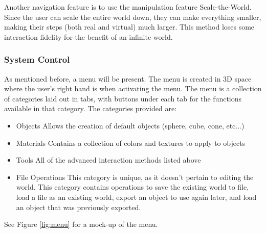 Another navigation feature is to use the manipulation feature Scale-the-World.
Since the user can scale the entire world down, they can make everything smaller, making their steps (both real and virtual) much larger.
This method loses some interaction fidelity for the benefit of an infinite world.

\subsubsection{System Control}
\label{Design:Interaction:SystemControl}
As mentioned before, a menu will be present.
The menu is created in 3D space where the user's right hand is when activating the menu.
The menu is a collection of categories laid out in tabs, with buttons under each tab for the functions available in that category.
The categories provided are:
\begin{itemize}
	\item Objects
	\subitem Allows the creation of default objects (sphere, cube, cone, etc...)
	\item Materials
	\subitem Contains a collection of colors and textures to apply to objects
	\item Tools
	\subitem All of the advanced interaction methods listed above
	\item File Operations
	\subitem This category is unique, as it doesn't pertain to editing the world.  This category contains operations to save the existing world to file, load a file as an existing world, export an object to use again later, and load an object that was previously exported.
\end{itemize}


See Figure \ref{fig:menu} for a mock-up of the menu.

